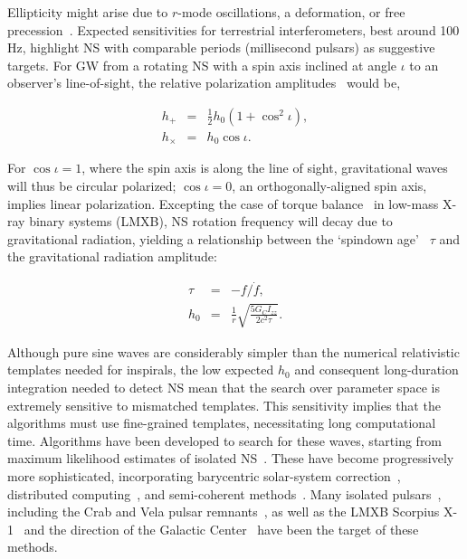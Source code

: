 Ellipticity might arise due to $r$-mode oscillations, a deformation, or free precession~\cite{Shawhan2010}.
Expected sensitivities for terrestrial interferometers, best around 100 Hz, highlight NS with comparable periods (millisecond pulsars) as suggestive targets.
For GW from a rotating NS with a spin axis inclined at angle $\iota$ to an observer's line-of-sight, the relative polarization amplitudes~\cite{DergachevThesis} would be,

\begin{eqnarray} 
h_+ &=& \tfrac{1}{2} h_0 (1 + \cos^2 \iota),\\
h_\times &=& h_0 \cos \iota.
\end{eqnarray}

For $\cos \iota = 1$, where the spin axis is along the line of sight, gravitational waves will thus be circular polarized; $\cos \iota = 0$, an orthogonally-aligned spin axis, implies linear polarization.
Excepting the case of torque balance~\cite{PapaloizouPringle1978,Wagoner1984} in low-mass X-ray binary systems (LMXB), NS rotation frequency will decay due to gravitational radiation, yielding a relationship between the `spindown age'~\cite{Brady1998} $\tau$ and the gravitational radiation amplitude:

        \begin{eqnarray}
        \tau &=& -f / \dot{f}, \\
        h_0 &=& \frac{1}{r} \sqrt{\frac{5 G_C I_{zz}}{2 c^2 \tau}}.
        \end{eqnarray}

Although pure sine waves are considerably simpler than the numerical relativistic templates needed for inspirals, the low expected $h_0$ and consequent long-duration integration needed to detect NS mean that the search over parameter space is extremely sensitive to mismatched templates.
This sensitivity implies that the algorithms must use fine-grained templates, necessitating long computational time.
Algorithms have been developed to search for these waves, starting from maximum likelihood estimates of isolated NS~\cite{Jaranowski1998}.
These have become progressively more sophisticated, incorporating barycentric solar-system correction~\cite{LSCPulsarS4}, distributed computing~\cite{LSCEinsteinHome2009}, and semi-coherent methods~\cite{LSCPowerFlux2009}.
Many isolated pulsars~\cite{Abbott2004,LSCPulsar2006}, including the Crab and Vela pulsar remnants~\cite{AasiPulsarInitialResults2014}, as well as the LMXB Scorpius X-1~\cite{AbbottPulsar2006} and the direction of the Galactic Center~\cite{AasiGalacticCenter2013} have been the target of these methods.

